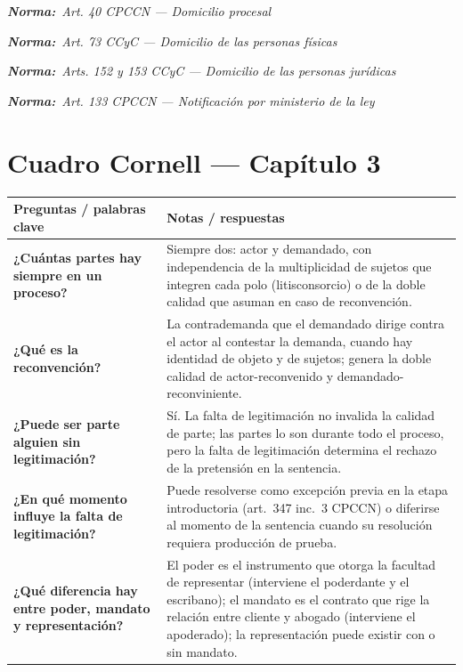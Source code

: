 \documentclass[12pt,oneside]{book}
\newcommand{\normaref}[1]{%
    \par\noindent\textbf{\textit{Norma:}}~\textit{#1}\par\vspace{0.2em}
}
\begin{document}
\normaref{Art. 40 CPCCN --- Domicilio procesal}
\normaref{Art. 73 CCyC --- Domicilio de las personas físicas}
\normaref{Arts. 152 y 153 CCyC --- Domicilio de las personas jurídicas}
\normaref{Art. 133 CPCCN --- Notificación por ministerio de la ley}

\section*{Cuadro Cornell --- Capítulo 3}

\begin{table}[H]
\centering
\begin{tabularx}{\textwidth}{
    >{\raggedright\arraybackslash}p{}
    >{\raggedright\arraybackslash}X
}
\toprule
\textbf{Preguntas / palabras clave} & \textbf{Notas / respuestas} \\
\midrule

\textbf{¿Cuántas partes hay siempre en un proceso?} &
Siempre dos: actor y demandado, con independencia de la multiplicidad de sujetos que integren cada polo (litisconsorcio) o de la doble calidad que asuman en caso de reconvención. \\

\textbf{¿Qué es la reconvención?} &
La contrademanda que el demandado dirige contra el actor al contestar la demanda, cuando hay identidad de objeto y de sujetos; genera la doble calidad de actor-reconvenido y demandado-reconviniente. \\

\textbf{¿Puede ser parte alguien sin legitimación?} &
Sí. La falta de legitimación no invalida la calidad de parte; las partes lo son durante todo el proceso, pero la falta de legitimación determina el rechazo de la pretensión en la sentencia. \\

\textbf{¿En qué momento influye la falta de legitimación?} &
Puede resolverse como excepción previa en la etapa introductoria (art.\ 347 inc.\ 3 CPCCN) o diferirse al momento de la sentencia cuando su resolución requiera producción de prueba. \\

\textbf{¿Qué diferencia hay entre poder, mandato y representación?} &
El poder es el instrumento que otorga la facultad de representar (interviene el poderdante y el escribano); el mandato es el contrato que rige la relación entre cliente y abogado (interviene el apoderado); la representación puede existir con o sin mandato. \\


\end{tabularx}
\end{table}
\end{document}
